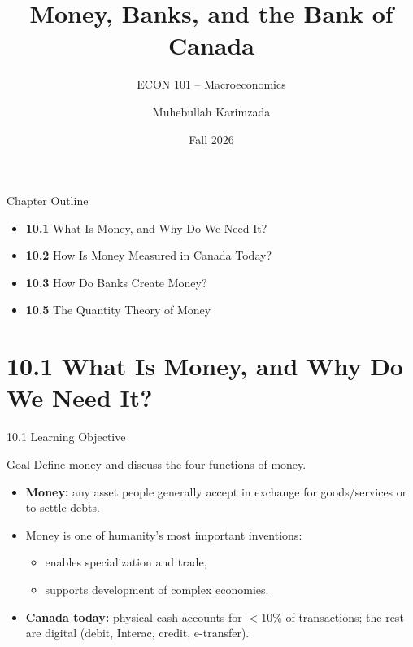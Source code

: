 \documentclass[aspectratio=169]{beamer}
\title{\textbf{Money, Banks, and the Bank of Canada}}
\subtitle{{\large ECON 101 -- Macroeconomics}}
\author{Muhebullah Karimzada}
\date{Fall 2026}
\begin{document}

\begin{frame}[plain]
  \titlepage
\end{frame}

\begin{frame}{Chapter Outline}
\transfade
\begin{itemize}[<+->]
  \item \textbf{10.1} What Is Money, and Why Do We Need It?
  \item \textbf{10.2} How Is Money Measured in Canada Today?
  \item \textbf{10.3} How Do Banks Create Money?
  \item \textbf{10.5} The Quantity Theory of Money
\end{itemize}
\end{frame}

\section{10.1 What Is Money, and Why Do We Need It?}

\begin{frame}{10.1 Learning Objective}
\transfade
\begin{block}{Goal}
Define money and discuss the four functions of money.
\end{block}
\begin{itemize}[<+->]
  \item \textbf{Money:} any asset people generally accept in exchange for goods/services or to settle debts.
  \item Money is one of humanity's most important inventions:
  \begin{itemize}[<+->]
    \item enables specialization and trade,
    \item supports development of complex economies.
  \end{itemize}
  \item \textbf{Canada today:} physical cash accounts for $<$10\% of transactions; the rest are digital (debit, Interac, credit, e-transfer).
\end{itemize}
\end{frame}
\end{document}
